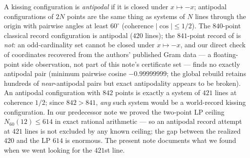 \documentclass[11pt]{article}
\theoremstyle{remark}
\begin{document}
A kissing configuration is \emph{antipodal} if it is closed under
$x\mapsto-x$; antipodal configurations of $2N$ points are the same thing as
systems of $N$ lines through the origin with pairwise angles at least
$60^\circ$ (coherence $|\cos|\le 1/2$). The $840$-point classical record
configuration is antipodal ($420$ lines); the $841$-point record of
\cite{TAY26} is \emph{not}: an odd-cardinality set cannot be closed under
$x\mapsto-x$, and our direct check of coordinates recovered from the
authors' published Gram data --- a floating-point side observation, not
part of this note's certificate set --- finds no exactly antipodal pair
(minimum pairwise cosine $-0.99999999$; the global rebuild retains
hundreds of \emph{near}-antipodal pairs but exact antipodality appears to
be broken).
An antipodal configuration with $842$ points is exactly a system of $421$
lines at coherence $1/2$; since $842>841$, \emph{any} such system would be
a world-record kissing configuration. In our predecessor note
\cite{RussellLines26} we proved the two-point LP ceiling
$N_{60}(12)\le 614$ in exact rational arithmetic --- so an antipodal record
attempt at $421$ lines is not excluded by any known ceiling; the gap
between the realized $420$ and the LP $614$ is enormous. The present note
documents what we found when we went looking for the $421$st line.
\end{document}
